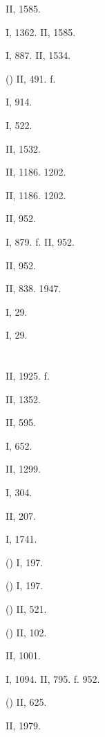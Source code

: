  II, 1585.

 I, 1362. II, 1585.

 I, 887. II, 1534.

 () II, 491. f.

 I, 914.

 I, 522.

 II, 1532.

 II, 1186. 1202.

 II, 1186. 1202.

 II, 952.

 I, 879. f. II, 952.

 II, 952.

 II, 838. 1947.

 I, 29.

 I, 29.

\section{}

 II, 1925. f.

 II, 1352.

 II, 595.

 I, 652.

 II, 1299.

 I, 304.

 II, 207.

 I, 1741.

 () I, 197.

 () I, 197.

 () II, 521.

 () II, 102.

 II, 1001.

 I, 1094. II, 795. f. 952.

 () II, 625.

 II, 1979.


